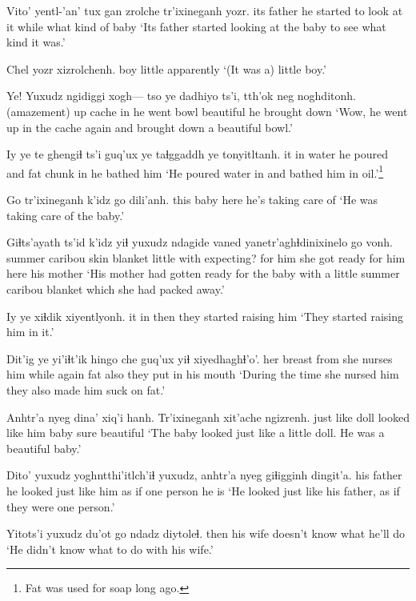 \documentclass[12pt]{article}
\begin{document}
\gll Vito'      yentl-'an'               tux   {gan zrolche}  {tr'ixineganh yozr.}
{its father} {he started to look at it} while {what kind of}  baby 
\glt `Its father started looking at the baby to see what kind it was.'
\glend

\gll Chel yozr xizrolchenh.
boy  little apparently
\glt `(It was a) little boy.'
\glend

\gll Ye! Yuxudz  ngidiggi xogh--- tso   ye dadhiyo ts'i, tth'ok neg       noghditonh.
(amazement) {}     up    {}         cache in {he went} {}    bowl   beautiful {he brought down}
\glt `Wow, he went up in the cache again and brought down a beautiful bowl.'
\glend

\gll Iy ye te    ghengiɬ   ts'i guq'ux ye taɬggaddh ye tonyitltanh.
it in water {he poured} and  fat {} chunk  in {he bathed him}
\glt `He poured water in and bathed him in oil.'\footnote{Fat was used for soap long ago.}
\glend

\gll Go   {tr'ixineganh k'idz} go   dili'anh.
this baby               here {he's taking care of}
\glt `He was taking care of the baby.'
\glend

\gll Giɬts'ayath          ts'id   k'idz  yiɬ yuxudz  ndagide vaned yanetr'aghɬdinixinelo      go   vonh.
{summer caribou skin}  blanket little with {}  {expecting?} {for him} {she got ready for him} here {his mother}
\glt `His mother had gotten ready for the baby with a little summer caribou blanket which she had packed away.'
\glend

\gll Iy ye xiɬdik xiyentlyonh.
it in  then   {they started raising him}
\glt `They started raising him in it.'
\glend

\gll Dit'ig     ye   yi'iɬt'ik  hingo che guq'ux yiɬ  xiyedhaghɬ'o'.
{her breast} from {she nurses him} while  again   fat  also {they put in his mouth}
\glt `During the time she nursed him they also made him suck on fat.'
\glend

\gll Anhtr'a   nyeg dina' xiq'i hanh.      Tr'ixineganh xit'ache ngizrenh.
{just like} {}  doll  {looked like} him baby         sure     beautiful
\glt `The baby looked just like a little doll. He was a beautiful baby.'
\glend

\gll Dito'      yuxudz yoghntthi'itlch'iɬ yuxudz, anhtr'a nyeg giɬigginh  dingit'a.
{his father} {}   {he looked just like him} {}    {as if} {} {one person} {he is}
\glt `He looked just like his father, as if they were one person.'
\glend

\gll Yitots'i yuxudz du'ot    {go   ndadz} diytoleɬ.
then     {}    {his wife} {doesn't know what}  {he'll do}
\glt `He didn't know what to do with his wife.'
\glend
\end{document}
